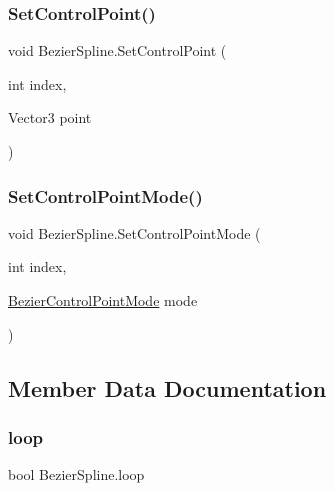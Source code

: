 \mbox{\label{classBezierSpline_aed423df0d5f7c31a82a617ad8ebc23e4}} 
\subsubsection{\texorpdfstring{Set\+Control\+Point()}{SetControlPoint()}}
{\footnotesize\ttfamily void Bezier\+Spline.\+Set\+Control\+Point (\begin{DoxyParamCaption}\item[{int}]{index,  }\item[{Vector3}]{point }\end{DoxyParamCaption})\hspace{0.3cm}{\ttfamily [inline]}}

\mbox{\label{classBezierSpline_a5c538c5216c5743de35ce9999760749c}} 
\subsubsection{\texorpdfstring{Set\+Control\+Point\+Mode()}{SetControlPointMode()}}
{\footnotesize\ttfamily void Bezier\+Spline.\+Set\+Control\+Point\+Mode (\begin{DoxyParamCaption}\item[{int}]{index,  }\item[{\hyperlink{BezierControlPointMode_8cs_a41ff1a7271616f36cab397d937ee41b0}{Bezier\+Control\+Point\+Mode}}]{mode }\end{DoxyParamCaption})\hspace{0.3cm}{\ttfamily [inline]}}



\subsection{Member Data Documentation}
\mbox{\label{classBezierSpline_a819d3c15ebc913ed8da39daa07fd89a7}} 
\subsubsection{\texorpdfstring{loop}{loop}}
{\footnotesize\ttfamily bool Bezier\+Spline.\+loop\hspace{0.3cm}{\ttfamily [private]}}

